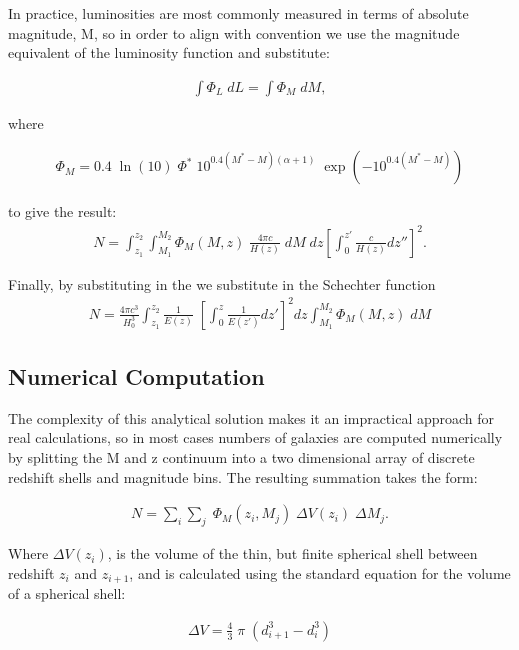 \documentclass[pdf,color]{UoBnote}
\begin{document}
In practice, luminosities are most commonly measured in terms of absolute magnitude, M, so in order to align with convention we use the magnitude equivalent of the luminosity function and substitute:

\begin{align}		
			\int { \Phi_L \; dL } = \int { \Phi_M\; dM} ,	
\end{align}

where	

\begin{align}	
			\Phi_M = 0.4 \; \ln(10) \; \Phi^* \; 10^{0.4(M^*-M)(\alpha+1)} \; \exp(-10^{0.4(M^*-M)}) 
\end{align}

to give the result:
\begin{align}	
			N = \int_{z_1}^{z_2}  { \int_{M_1}^{M_2} { \Phi_M(M,z)  \;  \frac{4 \pi c}{H(z)} \;  dM \; dz \left[ \int_0^{z'}{\frac{c }{H(z)} dz'' }\right ]^2} } .
\end{align}

Finally, by substituting in the we substitute in the Schechter function 
\begin{align}
			N = \frac{4 \pi c^3}{H_0^3} \int_{z_1}^{z_2}  \frac{1}{E(z)} \;  \left[ \int_0^{z}{\frac{1}{E(z')} dz' }\right ]^2 dz \int_{M_1}^{M_2} \Phi_M(M,z) \; dM
\end{align}


\subsection{Numerical Computation}

The complexity of this analytical solution makes it an impractical approach for real calculations, so in most cases numbers of galaxies are computed numerically by splitting the M and z continuum into a two dimensional array of discrete redshift shells and magnitude bins. The resulting summation takes the form:

\begin{align}
			N = \sum_i \sum_j \; \Phi_M(z_i,M_j) \; \Delta V(z_i) \; \Delta M_j .
\end{align}

Where $\Delta V(z_i)$, is the volume of the thin, but finite spherical shell between redshift $z_i$ and $z_{i+1}$, and is calculated using the standard equation for the volume of a spherical shell:

\begin{align}	
			\Delta V = \frac{4}{3} \; \pi \; ( d_{i+1}^3 - d_{i}^3)
\end{align}
\end{document}
